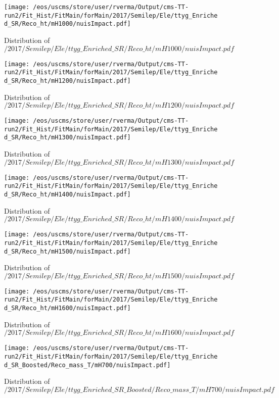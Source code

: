 \begin{figure}
\centering
\texttt{[image: /eos/uscms/store/user/rverma/Output/cms-TT-run2/Fit\_Hist/FitMain/forMain/2017/Semilep/Ele/ttyg\_Enriched\_SR/Reco\_ht/mH1000/nuisImpact.pdf]}
\caption{Distribution of $/2017/Semilep/Ele/ttyg\_Enriched\_SR/Reco\_ht/mH1000/nuisImpact.pdf$}
\end{figure}

\begin{figure}
\centering
\texttt{[image: /eos/uscms/store/user/rverma/Output/cms-TT-run2/Fit\_Hist/FitMain/forMain/2017/Semilep/Ele/ttyg\_Enriched\_SR/Reco\_ht/mH1200/nuisImpact.pdf]}
\caption{Distribution of $/2017/Semilep/Ele/ttyg\_Enriched\_SR/Reco\_ht/mH1200/nuisImpact.pdf$}
\end{figure}

\begin{figure}
\centering
\texttt{[image: /eos/uscms/store/user/rverma/Output/cms-TT-run2/Fit\_Hist/FitMain/forMain/2017/Semilep/Ele/ttyg\_Enriched\_SR/Reco\_ht/mH1300/nuisImpact.pdf]}
\caption{Distribution of $/2017/Semilep/Ele/ttyg\_Enriched\_SR/Reco\_ht/mH1300/nuisImpact.pdf$}
\end{figure}

\begin{figure}
\centering
\texttt{[image: /eos/uscms/store/user/rverma/Output/cms-TT-run2/Fit\_Hist/FitMain/forMain/2017/Semilep/Ele/ttyg\_Enriched\_SR/Reco\_ht/mH1400/nuisImpact.pdf]}
\caption{Distribution of $/2017/Semilep/Ele/ttyg\_Enriched\_SR/Reco\_ht/mH1400/nuisImpact.pdf$}
\end{figure}

\begin{figure}
\centering
\texttt{[image: /eos/uscms/store/user/rverma/Output/cms-TT-run2/Fit\_Hist/FitMain/forMain/2017/Semilep/Ele/ttyg\_Enriched\_SR/Reco\_ht/mH1500/nuisImpact.pdf]}
\caption{Distribution of $/2017/Semilep/Ele/ttyg\_Enriched\_SR/Reco\_ht/mH1500/nuisImpact.pdf$}
\end{figure}

\begin{figure}
\centering
\texttt{[image: /eos/uscms/store/user/rverma/Output/cms-TT-run2/Fit\_Hist/FitMain/forMain/2017/Semilep/Ele/ttyg\_Enriched\_SR/Reco\_ht/mH1600/nuisImpact.pdf]}
\caption{Distribution of $/2017/Semilep/Ele/ttyg\_Enriched\_SR/Reco\_ht/mH1600/nuisImpact.pdf$}
\end{figure}

\begin{figure}
\centering
\texttt{[image: /eos/uscms/store/user/rverma/Output/cms-TT-run2/Fit\_Hist/FitMain/forMain/2017/Semilep/Ele/ttyg\_Enriched\_SR\_Boosted/Reco\_mass\_T/mH700/nuisImpact.pdf]}
\caption{Distribution of $/2017/Semilep/Ele/ttyg\_Enriched\_SR\_Boosted/Reco\_mass\_T/mH700/nuisImpact.pdf$}
\end{figure}

